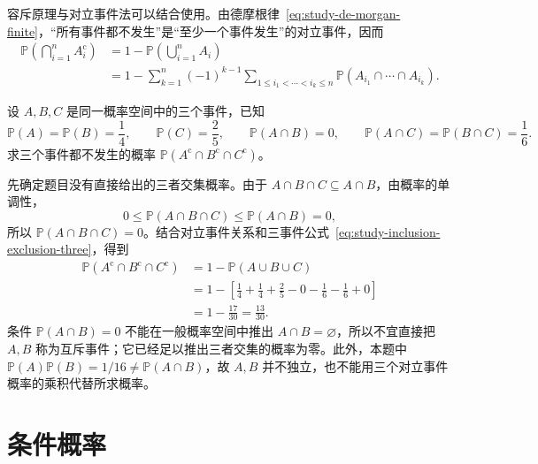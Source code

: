 容斥原理与对立事件法可以结合使用。由德摩根律~\eqref{eq:study-de-morgan-finite}，“所有事件都不发生”是“至少一个事件发生”的对立事件，因而
\begin{equation}
  \begin{aligned}
    \mathbb P\!\left(\bigcap_{i=1}^{n}A_i^{\mathrm c}\right)
      &=1-\mathbb P\!\left(\bigcup_{i=1}^{n}A_i\right)\\
      &=1-\sum_{k=1}^{n}(-1)^{k-1}
        \sum_{1\le i_1<\cdots<i_k\le n}
        \mathbb P(A_{i_1}\cap\cdots\cap A_{i_k}).
  \end{aligned}
  \label{eq:study-inclusion-exclusion-complement}
\end{equation}

\begin{example}
\label{ex:study-inclusion-exclusion-complement}
设 $A,B,C$ 是同一概率空间中的三个事件，已知
\[
  \mathbb P(A)=\mathbb P(B)=\frac14,\qquad \mathbb P(C)=\frac25,
  \qquad \mathbb P(A\cap B)=0,\qquad
  \mathbb P(A\cap C)=\mathbb P(B\cap C)=\frac16.
\]
求三个事件都不发生的概率 $\mathbb P(A^{\mathrm c}\cap B^{\mathrm c}\cap C^{\mathrm c})$。
\end{example}

\begin{solve}
先确定题目没有直接给出的三者交集概率。由于 $A\cap B\cap C\subseteq A\cap B$，由概率的单调性，
\[
  0\le\mathbb P(A\cap B\cap C)\le\mathbb P(A\cap B)=0,
\]
所以 $\mathbb P(A\cap B\cap C)=0$。结合对立事件关系和三事件公式~\eqref{eq:study-inclusion-exclusion-three}，得到
\begin{equation}
  \begin{aligned}
    \mathbb P(A^{\mathrm c}\cap B^{\mathrm c}\cap C^{\mathrm c})
      &=1-\mathbb P(A\cup B\cup C)\\
      &=1-\left[\frac14+\frac14+\frac25-0-\frac16-\frac16+0\right]\\
      &=1-\frac{17}{30}=\boxed{\frac{13}{30}}.
  \end{aligned}
  \label{eq:study-inclusion-exclusion-example-answer}
\end{equation}
条件 $\mathbb P(A\cap B)=0$ 不能在一般概率空间中推出 $A\cap B=\varnothing$，所以不宜直接把 $A,B$ 称为互斥事件；它已经足以推出三者交集的概率为零。此外，本题中 $\mathbb P(A)\mathbb P(B)=1/16\ne\mathbb P(A\cap B)$，故 $A,B$ 并不独立，也不能用三个对立事件概率的乘积代替所求概率。
\end{solve}

\section{条件概率}
\label{sec:study-conditional-probability}

